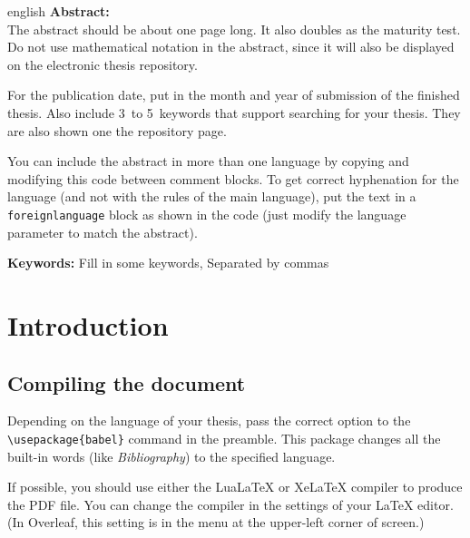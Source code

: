 \documentclass[a4paper, 11pt]{report}
\theoremstyle{plain}
\theoremstyle{definition}
\theoremstyle{remark}
\begin{document}
\begin{foreignlanguage}{english}
\noindent\textbf{Abstract:}\\ %
The abstract should be about one page long.
It also doubles as the maturity test.
Do not use mathematical notation in the abstract,
since it will also be displayed on the electronic thesis repository.

For the publication date, put in the month and year of submission of the finished thesis.
Also include 3~to 5~keywords that support searching for your thesis.
They are also shown one the repository page.

You can include the abstract in more than one language by copying and modifying
this code between comment blocks.
To get correct hyphenation for the language (and not with the rules of the main language),
put the text in a \verb|foreignlanguage| block as shown in the code
(just modify the language parameter to match the abstract).
\end{foreignlanguage}


\vfill

\noindent\textbf{Keywords:} Fill in some keywords, Separated by commas %




%
%
\cleardoublepage
\tableofcontents


%
%

\chapter{Introduction}

\section{Compiling the document}

Depending on the language of your thesis, pass the correct option to the
\verb|\usepackage{babel}| command in the preamble.
This package changes all the built-in words (like \emph{Bibliography}) to the specified language.

If possible, you should use either the LuaLaTeX or XeLaTeX compiler to produce the PDF file.
You can change the compiler in the settings of your \LaTeX{} editor.
(In Overleaf, this setting is in the menu at the upper-left corner of screen.)
\end{document}
